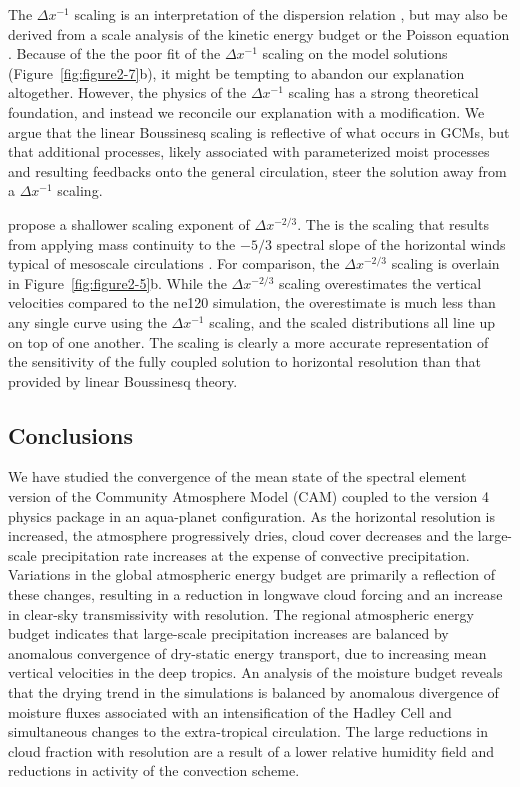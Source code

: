 The $\Delta x^{-1}$ scaling is an interpretation of the dispersion relation \citep{WK1982MWR}, but may also be derived from a scale analysis of the kinetic energy budget \citep{PG2006JAS} or the Poisson equation \citep{JR2016QJRMS}. Because of the the poor fit of the $\Delta x^{-1}$ scaling on the model solutions (Figure~\ref{fig:figure2-7}b), it might be tempting to abandon our explanation altogether. However, the physics of the $\Delta x^{-1}$ scaling has a strong theoretical foundation, and instead we reconcile our explanation with a modification. We argue that the linear Boussinesq scaling is reflective of what occurs in GCMs, but that additional processes, likely associated with parameterized moist processes and resulting feedbacks onto the general circulation, steer the solution away from a $\Delta x^{-1}$ scaling. 

\cite{RETAL2016CD} propose a shallower scaling exponent of $\Delta x^{-2/3}$. The  is the scaling that results from applying mass continuity to the $-5/3$  spectral slope of the horizontal winds typical of mesoscale circulations \citep{RETAL2016CD}. For comparison, the $\Delta x^{-2/3}$ scaling is overlain in Figure~\ref{fig:figure2-5}b. While the $\Delta x^{-2/3}$ scaling overestimates the vertical velocities compared to the ne120 simulation, the overestimate is much less than any single curve using the $\Delta x^{-1}$ scaling, and the scaled distributions all line up on top of one another. The \cite{RETAL2016CD} scaling is clearly a more accurate representation of the sensitivity of the fully coupled solution to horizontal resolution than that provided by linear Boussinesq theory.

\subsection{Conclusions}
We have studied the convergence of the mean state of the spectral element version of the Community Atmosphere Model (CAM) coupled to the version 4 physics package in an aqua-planet configuration. As the horizontal resolution is increased, the atmosphere progressively dries, cloud cover decreases and the large-scale precipitation rate increases at the expense of convective precipitation. Variations in the global atmospheric energy budget are primarily a reflection of these changes, resulting in a reduction in longwave cloud forcing and an increase in clear-sky transmissivity with resolution. The regional atmospheric energy budget indicates that large-scale precipitation increases are balanced by anomalous convergence of dry-static energy transport, due to increasing mean vertical velocities in the deep tropics. An analysis of the moisture budget reveals that the drying trend in the simulations is balanced by anomalous divergence of moisture fluxes associated with an intensification of the Hadley Cell and simultaneous changes to the extra-tropical circulation. The large reductions in cloud fraction with resolution are a result of a lower relative humidity field and reductions in activity of the convection scheme. 
 
